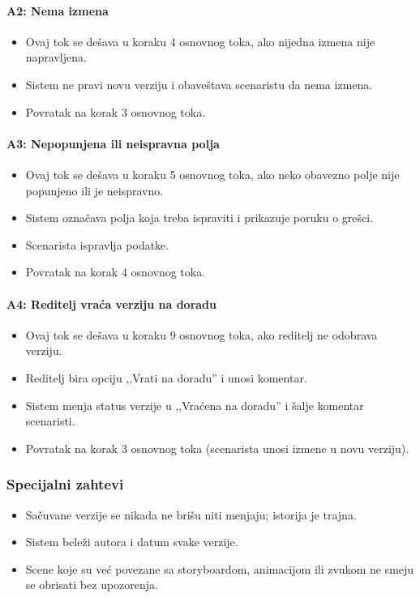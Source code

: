 \paragraph*{A2: Nema izmena}
\begin{itemize}
    \item Ovaj tok se dešava u koraku 4 osnovnog toka, ako nijedna izmena nije napravljena.
    \item Sistem ne pravi novu verziju i obaveštava scenaristu da nema izmena.
    \item Povratak na korak 3 osnovnog toka.
\end{itemize}

\paragraph*{A3: Nepopunjena ili neispravna polja}
\begin{itemize}
    \item Ovaj tok se dešava u koraku 5 osnovnog toka, ako neko obavezno polje nije popunjeno ili je neispravno.
    \item Sistem označava polja koja treba ispraviti i prikazuje poruku o grešci.
    \item Scenarista ispravlja podatke.
    \item Povratak na korak 4 osnovnog toka.
\end{itemize}

\paragraph*{A4: Reditelj vraća verziju na doradu}
\begin{itemize}
    \item Ovaj tok se dešava u koraku 9 osnovnog toka, ako reditelj ne odobrava verziju.
    \item Reditelj bira opciju ,,Vrati na doradu'' i unosi komentar.
    \item Sistem menja status verzije u ,,Vraćena na doradu'' i šalje komentar scenaristi.
    \item Povratak na korak 3 osnovnog toka (scenarista unosi izmene u novu verziju).
\end{itemize}

\subsubsection*{Specijalni zahtevi}
\begin{itemize}
    \item Sačuvane verzije se nikada ne brišu niti menjaju; istorija je trajna.
    \item Sistem beleži autora i datum svake verzije.
    \item Scene koje su već povezane sa storyboardom, animacijom ili zvukom ne smeju se obrisati bez upozorenja.
\end{itemize}

